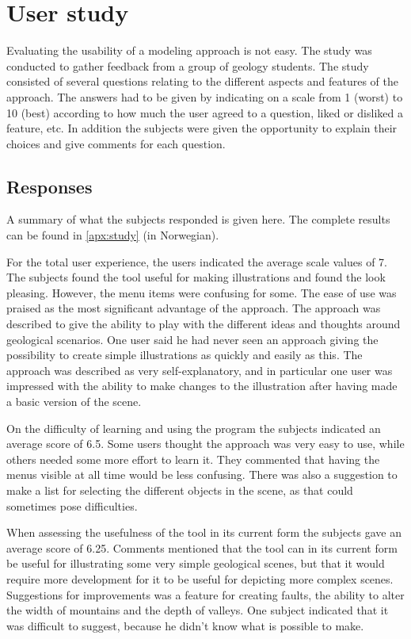 \documentclass[a4paper,12pt]{report}
\newcommand{\secref}[1]{\autoref{#1}}
\begin{document}
\clearpage

\section{User study}

Evaluating the usability of a modeling approach is not easy. The study was conducted to gather feedback from a group of geology students. The study consisted of several questions relating to the different aspects and features of the approach. The answers had to be given by indicating on a scale from 1 (worst) to 10 (best) according to how much the user agreed to a question, liked or disliked a feature, etc. In addition the subjects were given the opportunity to explain their choices and give comments for each question. 

\subsection{Responses}
A summary of what the subjects responded is given here. The complete results can be found in \secref{apx:study} (in Norwegian). 

For the total user experience, the users indicated the average scale values of 7. The subjects found the tool useful for making illustrations and found the look pleasing. However, the menu items were confusing for some. The ease of use was praised as the most significant advantage of the approach. The approach was described to give the ability to play with the different ideas and thoughts around geological scenarios. One user said he had never seen an approach giving the possibility to create simple illustrations as quickly and easily as this. The approach was described as very self-explanatory, and in particular one user was impressed with the ability to make changes to the illustration after having made a basic version of the scene.

On the difficulty of learning and using the program the subjects indicated an average score of 6.5. Some users thought the approach was very easy to use, while others needed some more effort to learn it. They commented that having the menus visible at all time would be less confusing. There was also a suggestion to make a list for selecting the different objects in the scene, as that could sometimes pose difficulties.

When assessing the usefulness of the tool in its current form the subjects gave an average score of 6.25. Comments mentioned that the tool can in its current form be useful for illustrating some very simple geological scenes, but that it would require more development for it to be useful for depicting more complex scenes. Suggestions for improvements was a feature for creating faults, the ability to alter the width of mountains and the depth of valleys. One subject indicated that it was difficult to suggest, because he didn't know what is possible to make.
\end{document}
